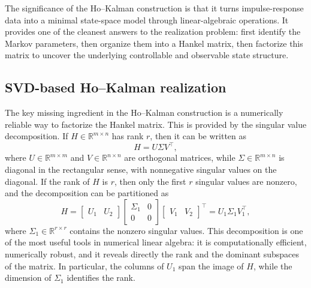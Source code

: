 The significance of the Ho--Kalman construction is that it turns impulse-response data into a minimal state-space model through linear-algebraic operations. It provides one of the cleanest answers to the realization problem: first identify the Markov parameters, then organize them into a Hankel matrix, then factorize this matrix to uncover the underlying controllable and observable state structure.

\subsection{SVD-based Ho--Kalman realization}

The key missing ingredient in the Ho--Kalman construction is a numerically reliable way to factorize the Hankel matrix. This is provided by the singular value decomposition. If \(H\in\mathbb{R}^{m\times n}\) has rank \(r\), then it can be written as
\[
H = U\Sigma V^\top,
\]
where \(U\in\mathbb{R}^{m\times m}\) and \(V\in\mathbb{R}^{n\times n}\) are orthogonal matrices, while \(\Sigma\in\mathbb{R}^{m\times n}\) is diagonal in the rectangular sense, with nonnegative singular values on the diagonal. If the rank of \(H\) is \(r\), then only the first \(r\) singular values are nonzero, and the decomposition can be partitioned as
\[
H=
\begin{bmatrix}
U_1 & U_2
\end{bmatrix}
\begin{bmatrix}
\Sigma_1 & 0\\
0 & 0
\end{bmatrix}
\begin{bmatrix}
V_1 & V_2
\end{bmatrix}^{\!\top}
=
U_1\Sigma_1V_1^\top,
\]
where \(\Sigma_1\in\mathbb{R}^{r\times r}\) contains the nonzero singular values. This decomposition is one of the most useful tools in numerical linear algebra: it is computationally efficient, numerically robust, and it reveals directly the rank and the dominant subspaces of the matrix. In particular, the columns of \(U_1\) span the image of \(H\), while the dimension of \(\Sigma_1\) identifies the rank.

